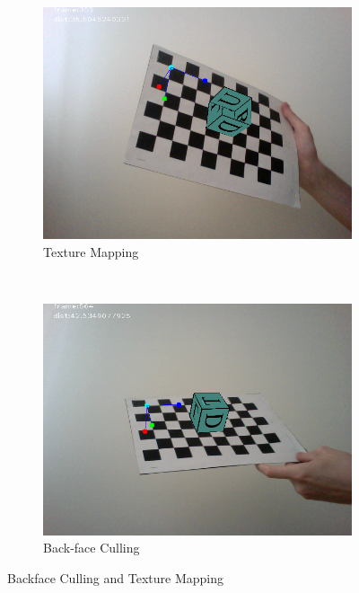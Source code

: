  \begin{figure}[h!]
	\begin{subfigure}[b]{0.5\textwidth}
		\includegraphics[width=\textwidth]{Handin3/images/culling.png}
		\caption{Texture Mapping}
		\label{subfig:texture}
	\end{subfigure}
	~
	\begin{subfigure}[b]{0.5\textwidth}
		\includegraphics[width=\textwidth]{Handin3/images/texture2.png}
		\caption{Back-face Culling}
		\label{subfig:backculling}
	\end{subfigure}
	
	\label{fig:texturing}
	\caption{Backface Culling and Texture Mapping}
\end{figure}